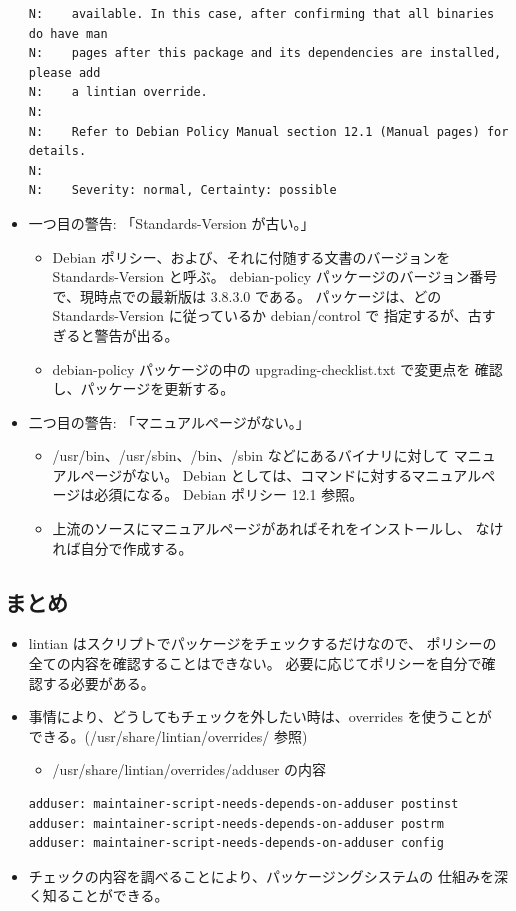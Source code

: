 \documentclass[mingoth,a4paper]{jsarticle}
\begin{document}
\begin{itemize}
\begin{screen}[5]
{\begin{verbatim}
N:    available. In this case, after confirming that all binaries do have man
N:    pages after this package and its dependencies are installed, please add
N:    a lintian override.
N:    
N:    Refer to Debian Policy Manual section 12.1 (Manual pages) for details.
N:    
N:    Severity: normal, Certainty: possible
\end{verbatim}
      }
  \end{screen}
\item 一つ目の警告: 「Standards-Version が古い。」
  \begin{itemize}
  \item Debian ポリシー、および、それに付随する文書のバージョンを
    Standards-Version と呼ぶ。
    debian-policy パッケージのバージョン番号で、現時点での最新版は
    3.8.3.0 である。
    パッケージは、どの Standards-Version に従っているか debian/control で
    指定するが、古すぎると警告が出る。
  \item debian-policy パッケージの中の upgrading-checklist.txt で変更点を
    確認し、パッケージを更新する。
  \end{itemize}
\item 二つ目の警告: 「マニュアルページがない。」
  \begin{itemize}
  \item /usr/bin、/usr/sbin、/bin、/sbin などにあるバイナリに対して
    マニュアルページがない。
    Debian としては、コマンドに対するマニュアルページは必須になる。
    Debian ポリシー 12.1 参照。
  \item 上流のソースにマニュアルページがあればそれをインストールし、
    なければ自分で作成する。
  \end{itemize}
\end{itemize}

\subsection{まとめ}

\begin{itemize}
\item lintian はスクリプトでパッケージをチェックするだけなので、
  ポリシーの全ての内容を確認することはできない。
  必要に応じてポリシーを自分で確認する必要がある。
\item 事情により、どうしてもチェックを外したい時は、overrides を使うことが
  できる。(/usr/share/lintian/overrides/ 参照)
  \begin{itemize}
  \item /usr/share/lintian/overrides/adduser の内容
  \end{itemize}
  \begin{screen}[5]
    {\footnotesize{}
\begin{verbatim}
adduser: maintainer-script-needs-depends-on-adduser postinst
adduser: maintainer-script-needs-depends-on-adduser postrm
adduser: maintainer-script-needs-depends-on-adduser config
\end{verbatim}
      }
  \end{screen}
\item チェックの内容を調べることにより、パッケージングシステムの
  仕組みを深く知ることができる。
\end{itemize}
\end{document}
